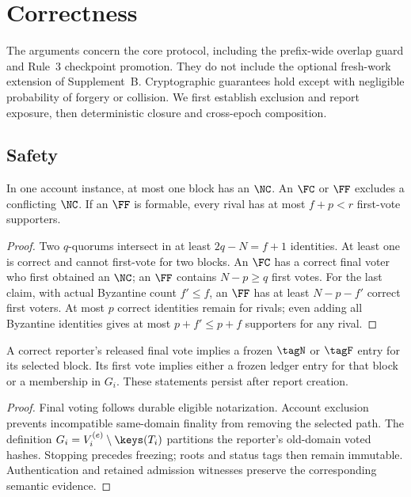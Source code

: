 \section{Correctness}
\label{sec:correctness}
The arguments concern the core protocol, including the prefix-wide overlap guard and Rule~3 checkpoint promotion. They do not include the optional fresh-work extension of Supplement~B. Cryptographic guarantees hold except with negligible probability of forgery or collision. We first establish exclusion and report exposure, then deterministic closure and cross-epoch composition.

\subsection{Safety}
\begin{lemma}
\label{lem:exclusion}
In one account instance, at most one block has an $\NC$. An $\FC$ or $\FF$ excludes a conflicting $\NC$. If an $\FF$ is formable, every rival has at most $f+p<r$ first-vote supporters.
\end{lemma}
\begin{proof}
Two $q$-quorums intersect in at least $2q-N=f+1$ identities. At least one is correct and cannot first-vote for two blocks. An $\FC$ has a correct final voter who first obtained an $\NC$; an $\FF$ contains $N-p\geq q$ first votes. For the last claim, with actual Byzantine count $f'\leq f$, an $\FF$ has at least $N-p-f'$ correct first voters. At most $p$ correct identities remain for rivals; even adding all Byzantine identities gives at most $p+f'\leq p+f$ supporters for any rival.
\end{proof}

\begin{lemma}
\label{lem:exposure}
A correct reporter's released final vote implies a frozen $\tagN$ or $\tagF$ entry for its selected block. Its first vote implies either a frozen ledger entry for that block or a membership in $G_i$. These statements persist after report creation.
\end{lemma}
\begin{proof}
Final voting follows durable eligible notarization. Account exclusion prevents incompatible same-domain finality from removing the selected path. The definition $G_i=V_i^{(e)}\setminus\keys(T_i)$ partitions the reporter's old-domain voted hashes. Stopping precedes freezing; roots and status tags then remain immutable. Authentication and retained admission witnesses preserve the corresponding semantic evidence.
\end{proof}


